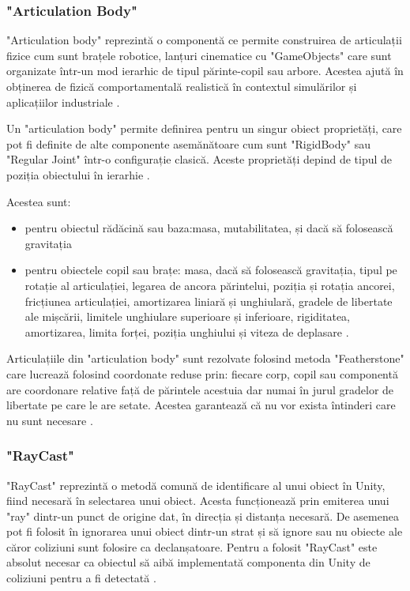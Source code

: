\subsubsection{"Articulation Body"}
"Articulation body" reprezintă o componentă ce permite construirea de articulații fizice cum sunt brațele robotice, lanțuri cinematice cu "GameObjects" care sunt organizate într-un mod ierarhic de tipul părinte-copil sau arbore. Acestea ajută în obținerea de fizică comportamentală realistică în contextul simulărilor și aplicațiilor industriale \cite{ABC}.



Un "articulation body" permite definirea pentru un singur obiect proprietăți, care pot fi definite de alte componente asemănătoare cum sunt "RigidBody" sau "Regular Joint" într-o configurație clasică. Aceste proprietăți depind de tipul de poziția obiectului în ierarhie \cite{ABC}. 

Acestea sunt:
\begin{itemize}
	\item pentru obiectul rădăcină sau baza:masa, mutabilitatea, și dacă să folosească gravitația \cite{ABC}
	\item pentru obiectele copil sau brațe: masa, dacă să folosească gravitația, tipul pe rotație al articulației, legarea de ancora părintelui, poziția și rotația ancorei, fricțiunea articulației, amortizarea liniară și unghiulară, gradele de libertate ale mișcării, limitele unghiulare superioare și inferioare, rigiditatea, amortizarea, limita forței, poziția unghiului și viteza de deplasare \cite{ABC}.
\end{itemize}
Articulațiile din "articulation body" sunt rezolvate folosind metoda "Featherstone" care lucrează folosind coordonate reduse prin: fiecare corp, copil sau componentă are coordonare relative față de  părintele acestuia dar numai în jurul gradelor de libertate pe care le are setate. Acestea garantează că nu vor exista întinderi care nu sunt necesare \cite{ABC1}.


\subsubsection{"RayCast"}
 "RayCast" reprezintă o metodă comună de identificare al unui obiect în Unity, fiind necesară în selectarea unui obiect. Acesta funcționează prin emiterea unui "ray" dintr-un punct de origine dat, în direcția și distanța necesară. De asemenea pot fi folosit în ignorarea unui obiect dintr-un strat și să ignore sau nu obiecte ale căror coliziuni sunt folosire ca declanșatoare. Pentru a folosit "RayCast" este absolut necesar ca obiectul să aibă implementată componenta din Unity de coliziuni pentru a fi detectată \cite{RayCast}.

